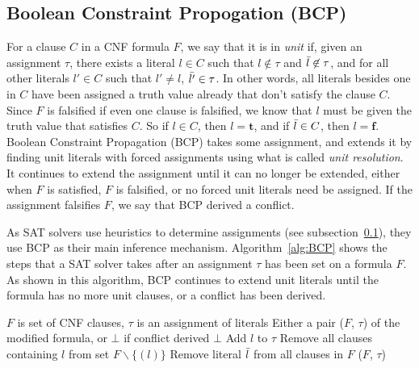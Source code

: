 \documentclass[12pt]{article}
\theoremstyle{definition}
\begin{document}
\subsection{Boolean Constraint Propogation (BCP)} \label{subsec:BCP}
For a clause $C$ in a CNF formula $F$, we say that it is in \textit{unit} if, given an assignment $\tau$, there exists a literal $l \in C$ such that $l \not\in \tau$ and $\Bar{l} \not\in \tau$, and for all other literals $l' \in C$ such that $l' \ne l$, $\Bar{l'} \in \tau$. In other words, all literals besides one in $C$ have been assigned a truth value already that don't satisfy the clause $C$. Since $F$ is falsified if even one clause is falsified, we know that $l$ must be given the truth value that satisfies $C$. So if $l \in C$, then $l = \boldsymbol t$, and if $\Bar{l} \in C$, then $l = \boldsymbol f$. 
Boolean Constraint Propagation (BCP) takes some assignment, and extends it by finding unit literals with forced assignments using what is called \textit{unit resolution}. It continues to extend the assignment until it can no longer be extended, either when $F$ is satisfied, $F$ is falsified, or no forced unit literals need be assigned. If the assignment falsifies $F$, we say that BCP derived a conflict. \par
As SAT solvers use heuristics to determine assignments (see subsection~\ref{subsec:BCP}), they use BCP as their main inference mechanism. Algorithm~\ref{alg:BCP} shows the steps that a SAT solver takes after an assignment $\tau$ has been set on a formula $F$. As shown in this algorithm, BCP continues to extend unit literals until the formula has no more unit clauses, or a conflict has been derived. 
\begin{algorithm}
\caption{$BCP(F, \tau)$}
\label{alg:BCP}
\begin{algorithmic}[1]
    \Require $F$ is set of CNF clauses, $\tau$ is an assignment of literals
    \Ensure Either a pair ($F$, $\tau$) of the modified formula, or $\bot$ if conflict derived
            \Return $\bot$ 
        \EndIf
        \State Add $l$ to $\tau$
        \State Remove all clauses containing $l$ from set $F \backslash \{(l)\}$
        \State Remove literal $\Bar{l}$ from all clauses in $F$
    \EndWhile
    \State \Return ($F$, $\tau$)
\end{algorithmic}
\end{algorithm}
\end{document}
